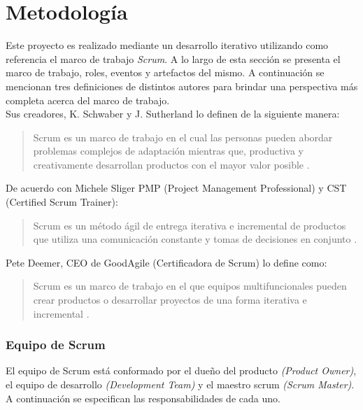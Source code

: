 \chapter{Metodología} \label{ch:metodologia}

 Este proyecto es realizado mediante un desarrollo iterativo utilizando como referencia
 el marco de trabajo {\it Scrum}. A lo largo de esta sección se presenta el marco de trabajo,
 roles, eventos y artefactos del mismo. A continuación se mencionan tres definiciones
 de distintos autores para brindar una perspectiva más completa acerca del marco de trabajo.\\

    \noindent Sus creadores, K. Schwaber y J. Sutherland lo definen de la siguiente manera:
        \begin{quote}
        Scrum es un marco de trabajo en el cual las personas pueden abordar
        problemas complejos de adaptación mientras que, productiva y creativamente
        desarrollan productos con el mayor valor posible \cite{TheScrumGuide}.
        \end{quote}

    \noindent De acuerdo con Michele Sliger PMP (Project Management Professional) y CST (Certified
     Scrum Trainer):
        \begin{quote}
        Scrum es un método ágil de entrega iterativa e incremental de productos que
        utiliza una comunicación constante y tomas de decisiones en conjunto \cite{Sliger1}.
        \end{quote}

    \noindent Pete Deemer, CEO de GoodAgile (Certificadora de Scrum) lo define como:
        \begin{quote}
        Scrum es un marco de trabajo en el que equipos multifuncionales pueden crear productos
        o desarrollar proyectos de una forma iterativa e incremental \cite{ScrumPrimer}.
        \end{quote}


\clearpage

\subsection{Equipo de Scrum}

 El equipo de Scrum está conformado por el dueño del producto {\em(Product Owner)},
 el equipo de desarrollo {\em(Development Team)} y el maestro scrum
 {\em(Scrum Master)}. A continuación se especifican las responsabilidades de cada uno.


